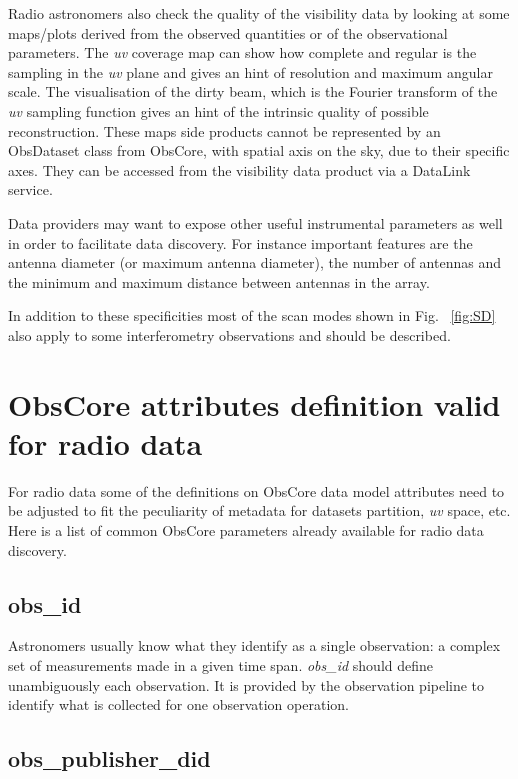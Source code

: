 \documentclass[11pt,a4paper]{ivoa}
\begin{document}
Radio astronomers also check the quality of the visibility data by looking at some maps/plots derived from the observed quantities or of the observational parameters.
The \emph{uv} coverage map can show how complete and regular is the sampling in
the \emph{uv} plane and gives an hint of resolution and maximum angular scale.
The visualisation of the dirty beam, which is the Fourier transform of the \emph{uv} sampling
function gives an hint of the intrinsic quality of possible reconstruction. 
These maps side products cannot be represented by an ObsDataset class from ObsCore, with spatial axis on the sky, 
due to their specific axes. 
They can be accessed from the visibility data product via a DataLink service.  

Data providers may want to expose other useful instrumental parameters as well in order 
to facilitate data discovery.  For instance important features are the antenna diameter 
(or maximum antenna diameter), the number of
antennas and the minimum and maximum distance between antennas in the array.

In addition to these specificities most of the scan modes shown in Fig. ~\ref{fig:SD} also
apply to some interferometry observations and should be described.

\section{ObsCore attributes definition valid for radio data}
\label{sec:ObsCoreRadDef}

For radio data some of the definitions on ObsCore data model attributes need to be adjusted
to fit the peculiarity of metadata for datasets partition, \emph{uv} space, etc.
Here is a list of common ObsCore parameters already available for radio data discovery.

\subsection{obs\_id}

Astronomers usually know what they identify as a single observation: a complex set of
measurements made in a given time span. \emph{obs\_id} should define unambiguously each
observation. It is provided by the observation pipeline to identify what is collected for one observation operation.

\subsection{obs\_publisher\_did}
\end{document}
